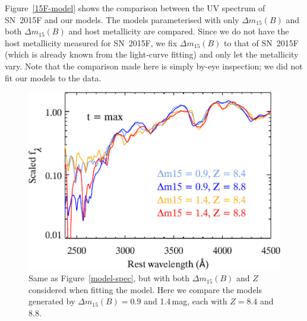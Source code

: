 \documentclass[useAMS,usenatbib]{mn2e}
\newcommand{\deltam}{\ensuremath{\Delta m_{15}}}
\begin{document}
Figure~\ref{15F-model} shows the comparison between the UV spectrum of SN~2015F and our models. The models parameterised with only $\deltam(B)$ and both $\deltam(B)$ and host metallicity are compared. Since we do not have the host metallicity measured for SN~2015F, we fix $\deltam(B)$ to that of SN~2015F (which is already known from the light-curve fitting) and only let the metallicity vary.  Note that the comparison made here is simply by-eye inspection; we did not fit our models to the data.

\begin{figure}
	\centering
		\includegraphics[scale=0.74]{plot/uv_spec_model_max_dm15_metal.pdf}
                \caption{Same as Figure~\ref{model-spec}, but with both $\deltam(B)$ and $Z$ considered when fitting the model. Here we compare the models generated by $\deltam(B)=0.9$ and 1.4\,mag, each with $Z=8.4$ and 8.8.}
        \label{model-spec2}
\end{figure}
\end{document}
